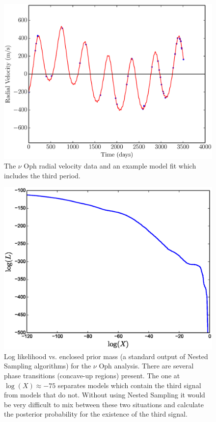 \documentclass[useAMS,usenatbib]{mn2e}
\begin{document}
\begin{figure}
\includegraphics[scale=0.45]{Figures/nuoph.eps}
\caption{The $\nu$ Oph radial velocity data and an example model fit which
includes the third period.\label{fig:nuoph}}
\end{figure}

\begin{figure}
\includegraphics[scale=0.45]{Figures/logl0.eps}
\caption{Log likelihood vs. enclosed prior mass (a standard output of Nested
Sampling algorithms) for the $\nu$ Oph analysis.
There are several phase transitions (concave-up regions) present. The one at
$\log(X) \approx -75$ separates models which contain the third signal from
models that do not. Without using Nested Sampling it would be very difficult
to mix between these two situations and calculate the posterior probability
for the existence of the third signal.
\label{fig:logl0}}
\end{figure}
\end{document}
